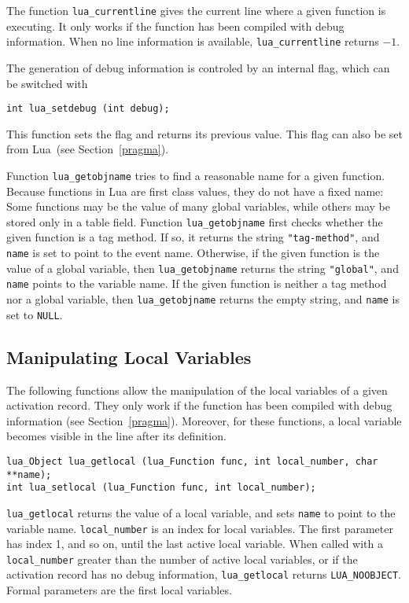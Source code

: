 \documentclass[11pt]{article}
\newcommand{\See}[1]{Section~\ref{#1}}
\newcommand{\see}[1]{(see \See{#1})}
\newcommand{\Math}[1]{$#1$}
\begin{document}
The function \verb|lua_currentline| gives the current line where
a given function is executing.
It only works if the function has been compiled with debug
information.
When no line information is available,
\verb|lua_currentline| returns \Math{-1}.

The generation of debug information is controled by an internal flag,
which can be switched with
\begin{verbatim}
int lua_setdebug (int debug);
\end{verbatim}
This function sets the flag and returns its previous value.
This flag can also be set from Lua~\see{pragma}.

Function \verb|lua_getobjname| tries to find a reasonable name for
a given function.
Because functions in Lua are first class values,
they do not have a fixed name:
Some functions may be the value of many global variables,
while others may be stored only in a table field.
Function \verb|lua_getobjname| first checks whether the given
function is a tag method.
If so, it returns the string \verb|"tag-method"|,
and \verb|name| is set to point to the event name.
Otherwise, if the given function is the value of a global variable,
then \verb|lua_getobjname| returns the string \verb|"global"|,
and \verb|name| points to the variable name.
If the given function is neither a tag method nor a global variable,
then \verb|lua_getobjname| returns the empty string,
and \verb|name| is set to \verb|NULL|.

\subsection{Manipulating Local Variables}

The following functions allow the manipulation of the
local variables of a given activation record.
They only work if the function has been compiled with debug
information \see{pragma}.
Moreover, for these functions, a local variable becomes
visible in the line after its definition. 
\begin{verbatim}
lua_Object lua_getlocal (lua_Function func, int local_number, char **name);
int lua_setlocal (lua_Function func, int local_number);
\end{verbatim}
\verb|lua_getlocal| returns the value of a local variable,
and sets \verb|name| to point to the variable name.
\verb|local_number| is an index for local variables.
The first parameter has index 1, and so on, until the
last active local variable.
When called with a \verb|local_number| greater than the
number of active local variables,
or if the activation record has no debug information,
\verb|lua_getlocal| returns \verb|LUA_NOOBJECT|.
Formal parameters are the first local variables.
\end{document}
